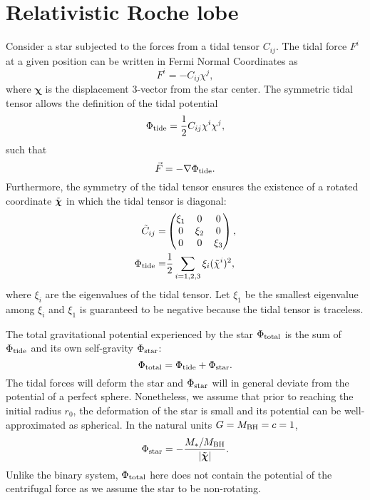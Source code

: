 \documentclass[useAMS,usenatbib]{mn2e}
\def\mstar{M_*}
\def\mBH{M_{\rm BH}}
\newcommand{\abs}[1]{\left|#1\right|}
\begin{document}
\section{Relativistic Roche lobe}\label{sec:Roche_lobe}
Consider a star subjected to the forces from a tidal tensor $C_{ij}$.
The tidal force $F^i$ at a given position can be written in Fermi Normal Coordinates as
\begin{equation}
    F^i=-C_{ij}\chi^j,
\end{equation}
where $\boldsymbol{\chi}$ is the displacement 3-vector from the star center.
The symmetric tidal tensor allows the definition of the tidal potential
\begin{equation}
    \Phi_{\rm tide}=\frac{1}{2}C_{ij}\chi^i\chi^j,
\end{equation}
such that
\begin{equation}
    \vec{F}=-\nabla\Phi_{\rm tide}.
\end{equation}
Furthermore, the symmetry of the tidal tensor ensures the existence of a rotated coordinate $\Tilde{\boldsymbol{\chi}}$ in which the tidal tensor is diagonal:
\begin{align}
    \Tilde{C}_{ij} = & \begin{pmatrix} \xi_1 & 0 & 0 \\ 0 & \xi_2 & 0 \\ 0 & 0 & \xi_3 \end{pmatrix}, \\
    \Phi_{\rm tide}= & \frac{1}{2}\sum_{i=1,2,3}\xi_i(\Tilde{\chi}^i)^2,
\end{align}
where $\xi_i$ are the eigenvalues of the tidal tensor.
Let $\xi_1$ be the smallest eigenvalue among $\xi_i$ and
$\xi_1$ is guaranteed to be negative because the tidal tensor is traceless.

The total gravitational potential experienced by the star $\Phi_{\rm total}$ is the sum of $\Phi_{\rm tide}$ and its own self-gravity $\Phi_{\rm star}$:
\begin{equation}
    \Phi_{\rm total}=\Phi_{\rm tide}+\Phi_{\rm star}.
\end{equation}
The tidal forces will deform the star and $\Phi_{\rm star}$ will in general deviate from the potential of a perfect sphere.
Nonetheless, we assume that prior to reaching the initial radius $r_0$, the deformation of the star is small and its potential can be well-approximated as spherical.
In the natural units $G=\mBH=c=1$,
\begin{equation}
    \Phi_{\rm star}=-\frac{\mstar/\mBH}{\abs{\Tilde{\boldsymbol{\chi}}}}.
\end{equation}
Unlike the binary system, $\Phi_{\rm total}$ here does not contain the potential of the centrifugal force as we assume the star to be non-rotating.
\end{document}
